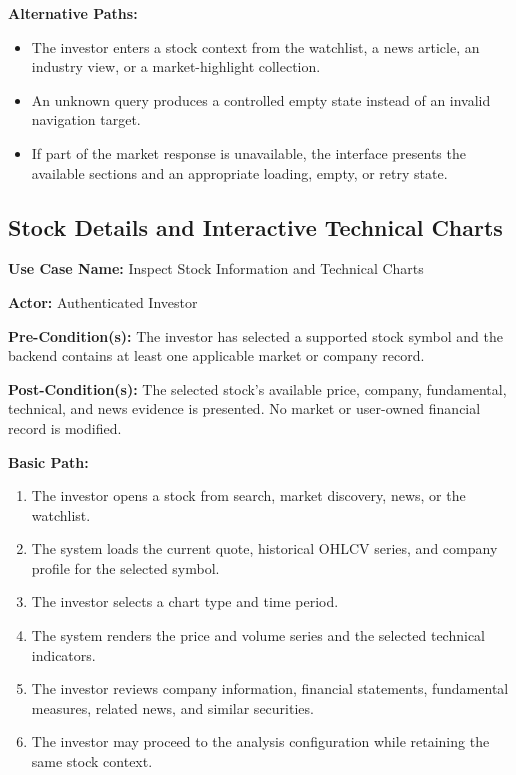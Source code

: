 \noindent\textbf{Alternative Paths:}
\begin{itemize}[leftmargin=*, nosep]
    \item The investor enters a stock context from the watchlist, a news article, an industry view, or a market-highlight collection.
    \item An unknown query produces a controlled empty state instead of an invalid navigation target.
    \item If part of the market response is unavailable, the interface presents the available sections and an appropriate loading, empty, or retry state.
\end{itemize}

\subsection{Stock Details and Interactive Technical Charts}
\label{subsec:stock-details-charts}

\noindent\textbf{Use Case Name:} Inspect Stock Information and Technical Charts

\noindent\textbf{Actor:} Authenticated Investor

\noindent\textbf{Pre-Condition(s):} The investor has selected a supported stock symbol and the backend contains at least one applicable market or company record.

\noindent\textbf{Post-Condition(s):} The selected stock's available price, company, fundamental, technical, and news evidence is presented. No market or user-owned financial record is modified.

\noindent\textbf{Basic Path:}
\begin{enumerate}[leftmargin=*, nosep]
    \item The investor opens a stock from search, market discovery, news, or the watchlist.
    \item The system loads the current quote, historical OHLCV series, and company profile for the selected symbol.
    \item The investor selects a chart type and time period.
    \item The system renders the price and volume series and the selected technical indicators.
    \item The investor reviews company information, financial statements, fundamental measures, related news, and similar securities.
    \item The investor may proceed to the analysis configuration while retaining the same stock context.
\end{enumerate}

